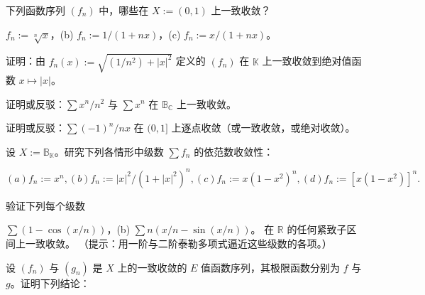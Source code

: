 \exerciseshead

\begin{exercises}
\item

下列函数序列 $ (f_n) $ 中，哪些在 $ X := (0, 1) $ 上一致收敛？

\begin{items}
\item

$ f_n := \sqrt[n]{x} $，(b)  $ f_n := 1/(1 + nx) $，(c)  $ f_n := x/(1 + nx) $。

\end{items}

\item

证明：由 $ f_n(x) := \sqrt{(1/n^2) + |x|^2} $ 定义的 $(f_n)$ 在 $\mathbb{K}$ 上一致收敛到绝对值函数 $x \mapsto |x|$。

\item

证明或反驳：$\sum x^n / n^2$ 与 $\sum x^n$ 在 $\mathbb{B}_{\mathbb{C}}$ 上一致收敛。

\item

证明或反驳：$\sum(-1)^n/nx$ 在 $(0,1]$ 上逐点收敛（或一致收敛，或绝对收敛）。

\item

设 $ X := \mathbb{B}_{\mathbb{K}} $。研究下列各情形中级数 $\sum f_n$ 的依范数收敛性：

\[
(a)f_{n}:=x^{n},(b)f_{n}:=|x|^{2}/(1+|x|^{2})^{n},(c)f_{n}:=x(1-x^{2})^{n},(d)f_{n}:=\left[x(1-x^{2})\right]^{n}.
\]
\item

验证下列每个级数

\begin{items}
\item

$\sum(1 - \cos(x/n)) $，(b)  $\sum n(x/n - \sin(x/n)) $。
在 $\mathbb{R}$ 的任何紧致子区间上一致收敛。
（提示：用一阶与二阶泰勒多项式逼近这些级数的各项。）

\end{items}

\item

设 $(f_n)$ 与 $(g_n)$ 是 $X$ 上的一致收敛的 $E$ 值函数序列，其极限函数分别为 $f$ 与 $g$。证明下列结论：

\begin{items}
\item


\end{items}
\end{exercises}
